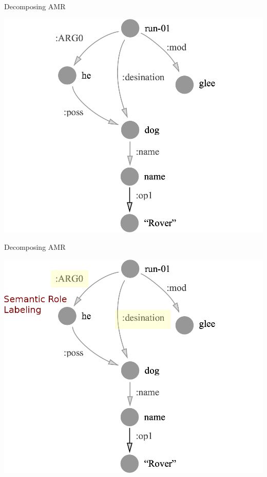 \documentclass[hyperref]{beamer}
\begin{document}
\begin{frame}{Decomposing AMR}
\begin{center}
\includegraphics[scale=0.25]{glee_base.png}
\end{center}
\end{frame}

\begin{frame}[noframenumbering]{Decomposing AMR}
\begin{center}
\includegraphics[scale=0.25]{glee_srl.png}
\end{center}
\end{frame}
\end{document}

